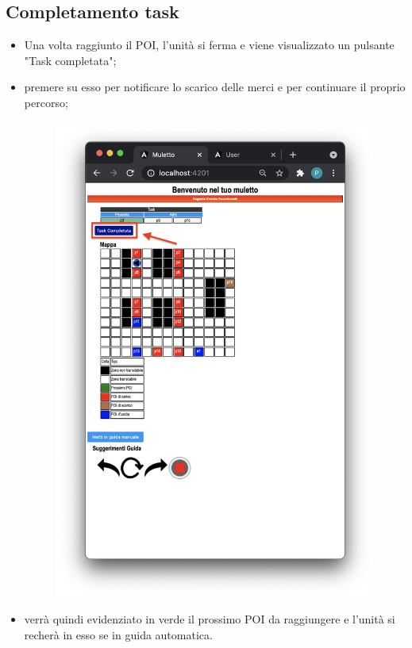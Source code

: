 \subsection{Completamento task}
\begin{itemize}
    \item Una volta raggiunto il POI, l'unità si ferma e viene visualizzato un pulsante "Task completata";
    \item premere su esso per notificare lo scarico delle merci e per continuare il proprio percorso;
    \begin{figure}[H]
        \centering
        \includegraphics[scale=0.45]{res/images/forklift_taskcompletata.png}
    \end{figure}
    \item verrà quindi evidenziato in verde il prossimo POI da raggiungere e l'unità si recherà in esso se in guida automatica.

\end{itemize}
